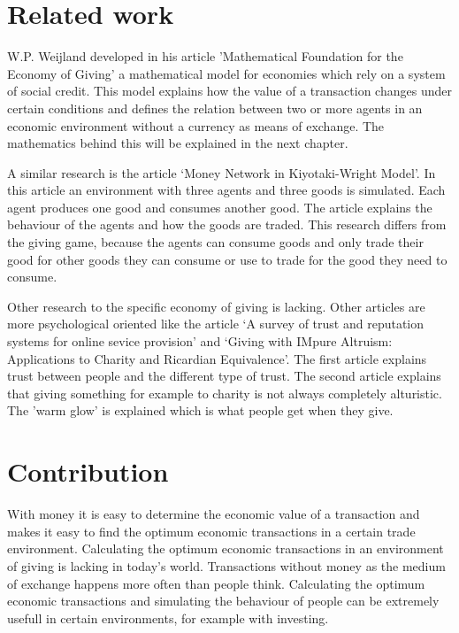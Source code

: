 \documentclass[twoside,openright]{uva-bachelor-thesis}
\begin{document}
\section{Related work}
W.P. Weijland developed in his article 'Mathematical Foundation for the Economy of Giving' a mathematical model for economies which rely on a system of social credit. This model  explains how the value of a transaction changes under certain conditions and defines the relation between two or more agents in an economic environment without a currency as means of exchange. The mathematics behind this will be explained in the next chapter.

A similar research is the article ‘Money Network in Kiyotaki-Wright Model’. In this article an environment with three agents and three goods is simulated. Each agent produces one good and consumes another good. The article explains the behaviour of the agents and how the goods are traded. This research differs from the giving game, because the agents can consume goods and only trade their good for other goods they can consume or use to trade for the good they need to consume. 

Other research to the specific economy of giving is lacking. Other articles are more psychological oriented like the article ‘A survey of trust and reputation systems for online sevice provision’ and ‘Giving with IMpure Altruism: Applications to Charity and Ricardian Equivalence’. The first article explains trust between people and the different type of trust. The second article explains that giving something for example to charity is not always completely alturistic. The 'warm glow' is explained which is what people get when they give. 


\section{Contribution}
With money it is easy to determine the economic value of a transaction and makes it easy to find the optimum economic transactions in a certain trade environment. Calculating the optimum economic transactions in an environment of giving is lacking in today’s world. Transactions without money as the medium of exchange happens more often than people think. Calculating the optimum economic transactions and simulating the behaviour of people can be extremely usefull in certain environments, for example with investing.
\end{document}
